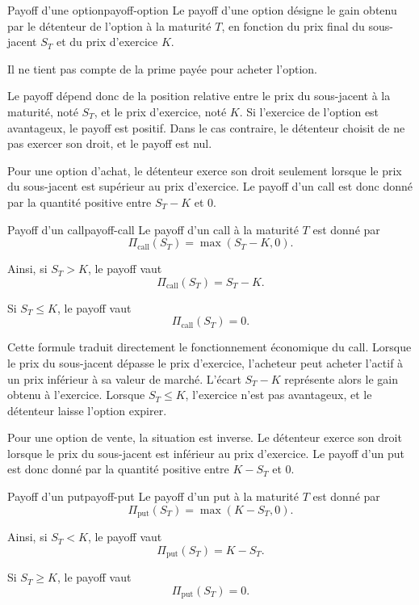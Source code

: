 \documentclass[11pt]{report}
\begin{document}
\begin{definition}{Payoff d'une option}{payoff-option}
Le payoff d'une option désigne le gain obtenu par le détenteur de l'option à la maturité $T$, en fonction du prix final du sous-jacent $S_T$ et du prix d'exercice $K$.

Il ne tient pas compte de la prime payée pour acheter l'option.
\end{definition}

Le payoff dépend donc de la position relative entre le prix du sous-jacent à la maturité, noté $S_T$, et le prix d'exercice, noté $K$. Si l'exercice de l'option est avantageux, le payoff est positif. Dans le cas contraire, le détenteur choisit de ne pas exercer son droit, et le payoff est nul.

Pour une option d'achat, le détenteur exerce son droit seulement lorsque le prix du sous-jacent est supérieur au prix d'exercice. Le payoff d'un call est donc donné par la quantité positive entre $S_T - K$ et $0$.

\begin{definition}{Payoff d'un call}{payoff-call}
Le payoff d'un call à la maturité $T$ est donné par
\[
\Pi_{\text{call}}(S_T) = \max(S_T - K, 0).
\]

Ainsi, si $S_T > K$, le payoff vaut
\[
\Pi_{\text{call}}(S_T) = S_T - K.
\]

Si $S_T \leq K$, le payoff vaut
\[
\Pi_{\text{call}}(S_T) = 0.
\]
\end{definition}

Cette formule traduit directement le fonctionnement économique du call. Lorsque le prix du sous-jacent dépasse le prix d'exercice, l'acheteur peut acheter l'actif à un prix inférieur à sa valeur de marché. L'écart $S_T - K$ représente alors le gain obtenu à l'exercice. Lorsque $S_T \leq K$, l'exercice n'est pas avantageux, et le détenteur laisse l'option expirer.

Pour une option de vente, la situation est inverse. Le détenteur exerce son droit lorsque le prix du sous-jacent est inférieur au prix d'exercice. Le payoff d'un put est donc donné par la quantité positive entre $K - S_T$ et $0$.

\begin{definition}{Payoff d'un put}{payoff-put}
Le payoff d'un put à la maturité $T$ est donné par
\[
\Pi_{\text{put}}(S_T) = \max(K - S_T, 0).
\]

Ainsi, si $S_T < K$, le payoff vaut
\[
\Pi_{\text{put}}(S_T) = K - S_T.
\]

Si $S_T \geq K$, le payoff vaut
\[
\Pi_{\text{put}}(S_T) = 0.
\]
\end{definition}
\end{document}
